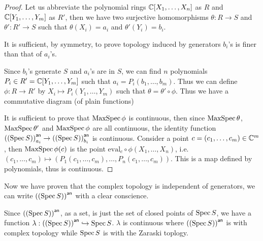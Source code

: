 \begin{proof}
  Let us abbreviate the polynomial rings $\mathbb{C}[X_{1},\dots, X_{n}]$ as $R$ and $\mathbb{C}[Y_{1},\dots, Y_{m}]$ as $R'$, then we have two surjective homomorphisms $\theta: R \to S$ and $\theta' : R' \to S$ such that $\theta(X_{i}) = a_{i}$ and $\theta'(Y_{i})=b_{i}$.

  It is sufficient, by symmetry, to prove topology induced by generators $b_{i}$'s is finer than that of $a_{i}$'s.

  Since $b_{i}$'s generate $S$ and $a_{i}$'s are in $S$, we can find $n$ polynomials $P_{i} \in R' = \mathbb{C}[Y_{1},\dots, Y_{m}]$ such that $a_{i} = P_{i}(b_{1},\dots, b_{m})$. Thus we can define $\phi : R \to R'$ by $X_{i}\mapsto P_{i}(Y_{1},\dots, Y_{m})$ such that $\theta = \theta' \circ \phi$. Thus we have a commutative diagram (of plain functions)
  \begin{center}
  \end{center}

  It is sufficient to prove that $\operatorname{MaxSpec} \phi$ is continuous, then since $\operatorname{MaxSpec} \theta$, $\operatorname{MaxSpec} \theta'$ and $\operatorname{MaxSpec} \phi$ are all continuous, the identity function $\left({\left(\operatorname{Spec} S\right)}\right)^{\mathsf{an}}_{a_{i}} \to \left({\left(\operatorname{Spec} S\right)}\right)^{\mathsf{an}}_{b_{i}}$ is continuous.
  Consider a point $c = (c_{1},\dots, c_{m}) \in \mathbb{C}^{m}$, then $\operatorname{MaxSpec}\phi(c)$ is the point $\mathrm{eval}_{c} \circ \phi (X_{1},\dots, X_{n})$, i.e. $(c_{1},\dots, c_{m}) \mapsto (P_{1}(c_{1},\dots,c_{m}),\dots, P_{n}(c_{1},\dots,c_{m}))$. This is a map defined by polynomials, thus is continuous.
\end{proof}

Now we have proven that the complex topology is independent of generators, we can write $\left({\left(\operatorname{Spec} S\right)}\right)^{\mathsf{an}}$ with a clear conscience.

\begin{theorem} Since $\left({\left(\operatorname{Spec} S\right)}\right)^{\mathsf{an}}$, as a set, is just the set of closed points of $\operatorname{Spec} S$, we have a function $\lambda: \left({\left(\operatorname{Spec} S\right)}\right)^{\mathsf{an}} \hookrightarrow \operatorname{Spec} S$. $\lambda$ is continuous where $\left({\left(\operatorname{Spec} S\right)}\right)^{\mathsf{an}}$ is with complex topology while $\operatorname{Spec} S$ is with the Zaraski toplogy.
\end{theorem}

